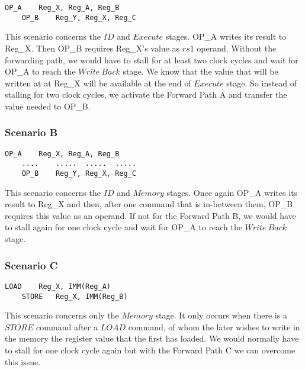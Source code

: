 \begin{lstlisting}[caption={Forward Path A Example},captionpos=b]
	OP_A	Reg_X, Reg_A, Reg_B
	OP_B 	Reg_Y, Reg_X, Reg_C
\end{lstlisting}



This scenario concerns the $ID$ and $Execute$ stages. OP\_A writes its result to Reg\_X. Then OP\_B requires Reg\_X's value as $rs1$ operand. Without the forwarding path, we would have to stall for at least two clock cycles and wait for OP\_A to reach the $Write\ Back$ stage. We know that the value that will be written at at Reg\_X will be available at the end of $Execute$ stage. So instead of stalling for two clock cycles, we activate the Forward Path A and transfer the value needed to OP\_B.

\clearpage

\subsubsection{Scenario B}
\label{3.2.5.2}

\begin{lstlisting}[caption={Forward Path B Example},captionpos=b]
	OP_A	Reg_X, Reg_A, Reg_B
	....	.....  .....  .....
	OP_B 	Reg_Y, Reg_X, Reg_C
\end{lstlisting}

This scenario concerns the $ID$ and $Memory$ stages. Once again OP\_A writes its result to Reg\_X and then, after one command that is in-between them, OP\_B requires this value as an operand. If not for the Forward Path B, we would have to stall again for one clock cycle and wait for OP\_A to reach the $Write\ Back$ stage.

\subsubsection{Scenario C}

\begin{lstlisting}[caption={Forward Path C Example},captionpos=b]
	LOAD 	Reg_X, IMM(Reg_A)
	STORE	Reg_X, IMM(Reg_B)
\end{lstlisting}

This scenario concerns only the $Memory$ stage. It only occurs when there is a $STORE$ command after a $LOAD$ command, of whom the later wishes to write in the memory the register value that the first has loaded. We would normally have to stall for one clock cycle again but with the Forward Path C we can overcome this issue. 

